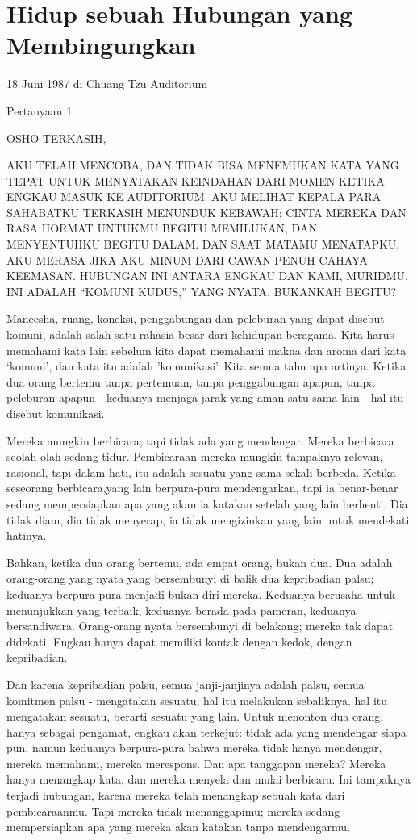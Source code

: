 \chapter{Hidup sebuah Hubungan yang Membingungkan}

18 Juni 1987 di Chuang Tzu Auditorium

Pertanyaan 1

OSHO TERKASIH,

AKU TELAH MENCOBA, DAN TIDAK BISA MENEMUKAN KATA YANG TEPAT UNTUK MENYATAKAN KEINDAHAN DARI MOMEN KETIKA ENGKAU MASUK KE AUDITORIUM. AKU MELIHAT KEPALA PARA SAHABATKU TERKASIH MENUNDUK KEBAWAH: CINTA MEREKA DAN RASA HORMAT UNTUKMU BEGITU MEMILUKAN, DAN MENYENTUHKU BEGITU DALAM. DAN SAAT MATAMU MENATAPKU, AKU MERASA JIKA AKU MINUM DARI CAWAN PENUH CAHAYA KEEMASAN. HUBUNGAN INI ANTARA ENGKAU DAN KAMI, MURIDMU, INI ADALAH “KOMUNI KUDUS,” YANG NYATA. BUKANKAH BEGITU?

Maneesha, ruang, koneksi, penggabungan dan peleburan yang dapat disebut komuni, adalah salah satu rahasia besar dari kehidupan beragama. Kita harus memahami kata lain sebelum kita dapat memahami makna dan aroma dari kata ‘komuni’, dan kata itu adalah 'komunikasi'. Kita semua tahu apa artinya. Ketika dua orang bertemu tanpa pertemuan, tanpa penggabungan apapun, tanpa peleburan apapun - keduanya menjaga jarak yang aman satu sama lain - hal itu disebut komunikasi.

Mereka mungkin berbicara, tapi tidak ada yang mendengar. Mereka berbicara seolah-olah sedang tidur. Pembicaraan mereka mungkin tampaknya relevan, rasional, tapi dalam hati, itu adalah sesuatu yang sama sekali berbeda. Ketika seseorang berbicara,yang lain berpura-pura mendengarkan, tapi ia benar-benar sedang mempersiapkan apa yang akan ia katakan setelah yang lain berhenti. Dia tidak diam, dia tidak menyerap, ia tidak mengizinkan yang lain untuk mendekati hatinya.

Bahkan, ketika dua orang bertemu, ada empat orang, bukan dua. Dua adalah orang-orang yang nyata yang bersembunyi di balik dua kepribadian palsu; keduanya berpura-pura menjadi bukan diri mereka. Keduanya berusaha untuk menunjukkan yang terbaik, keduanya berada pada pameran, keduanya bersandiwara. Orang-orang nyata bersembunyi di belakang; mereka tak dapat didekati. Engkau hanya dapat memiliki kontak dengan kedok, dengan kepribadian.

Dan karena kepribadian palsu, semua janji-janjinya adalah palsu, semua komitmen palsu - mengatakan sesuatu, hal itu melakukan sebaliknya. hal itu mengatakan sesuatu, berarti sesuatu yang lain. Untuk menonton dua orang, hanya sebagai pengamat, engkau akan terkejut: tidak ada yang mendengar siapa pun, namun keduanya berpura-pura bahwa mereka tidak hanya mendengar, mereka memahami, mereka merespons. Dan apa tanggapan mereka? Mereka hanya menangkap kata, dan mereka menyela dan mulai berbicara. Ini tampaknya terjadi hubungan, karena mereka telah menangkap sebuah kata dari pembicaraanmu. Tapi mereka tidak menanggapimu; mereka sedang mempersiapkan apa yang mereka akan katakan tanpa mendengarmu.

